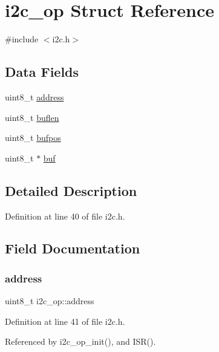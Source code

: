 \hypertarget{structi2c__op}{}\section{i2c\+\_\+op Struct Reference}
\label{structi2c__op}


{\ttfamily \#include $<$i2c.\+h$>$}

\subsection*{Data Fields}
\begin{DoxyCompactItemize}
\item 
uint8\+\_\+t \hyperlink{structi2c__op_ad26962ee9e46e40e9ab7d45419e28c18}{address}
\item 
uint8\+\_\+t \hyperlink{structi2c__op_afd970c99924335052fcc298abda4bfd5}{buflen}
\item 
uint8\+\_\+t \hyperlink{structi2c__op_a5d137a5400fc18224e7761017f0300fa}{bufpos}
\item 
uint8\+\_\+t $\ast$ \hyperlink{structi2c__op_ad988da068bf828e0f7ccfea5e9a5b83f}{buf}
\end{DoxyCompactItemize}


\subsection{Detailed Description}


Definition at line 40 of file i2c.\+h.



\subsection{Field Documentation}
\mbox{\label{structi2c__op_ad26962ee9e46e40e9ab7d45419e28c18}} 
\subsubsection{\texorpdfstring{address}{address}}
{\footnotesize\ttfamily uint8\+\_\+t i2c\+\_\+op\+::address}



Definition at line 41 of file i2c.\+h.



Referenced by i2c\+\_\+op\+\_\+init(), and I\+S\+R().


